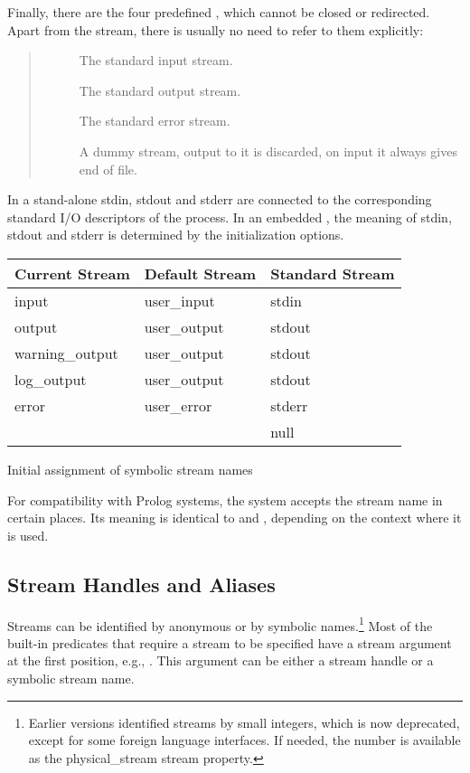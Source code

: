 Finally, there are the four predefined ,
which cannot be closed or redirected.  Apart from the 
stream, there is usually no need to refer to them explicitly:
\begin{quote}
\begin{description}
\item[]
  The standard input stream.
\item[]
  The standard output stream.
\item[]
  The standard error stream.
\item[]
  A dummy stream, output to it is discarded, on input it always
  gives end of file.
\end{description}
\end{quote}
In a stand-alone {\eclipse} stdin, stdout and stderr are connected
to the corresponding standard I/O descriptors of the process.
In an embedded {\eclipse}, the meaning of stdin, stdout and
stderr is determined by the {\eclipse} initialization options.

\begin{center}
\begin{tabular}{|l|l|l|}
\hline
Current Stream  & Default Stream & Standard Stream\\
\hline
\hline
input           & user_input  & stdin\\
\hline
output          & user_output & stdout\\
warning_output  & user_output & stdout\\
log_output      & user_output & stdout\\
\hline
error           & user_error  & stderr\\
\hline
                &             & null\\
\hline
\end{tabular}

Initial assignment of symbolic stream names
\end{center}

For compatibility with Prolog systems, the system accepts the stream
name  in certain places.  Its meaning is
identical to  and ,
depending on the context where it is used.

\subsection{Stream Handles and Aliases}
Streams can be identified by anonymous
 or by symbolic names.\footnote{%
    Earlier {\eclipse} versions identified streams by small integers, which
    is now deprecated, except for some foreign language interfaces. If needed,
    the number is available as the physical_stream stream property.}
Most of the built-in predicates that require a stream to be specified
have a stream argument at the first position,
e.g., . This argument can be either a
stream handle or a symbolic stream name.

